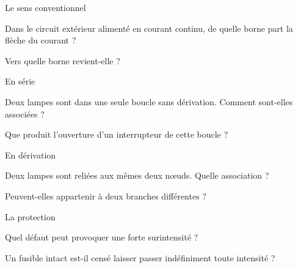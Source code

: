 \par\noindent\begin{minipage}{\linewidth}
\begin{exercice}[1]{Le sens conventionnel}
\begin{questions}
\item Dans le circuit extérieur alimenté en courant continu, de quelle borne part la flèche du courant ?
\item Vers quelle borne revient-elle ?
\end{questions}
\end{exercice}
\end{minipage}
\par\noindent\begin{minipage}{\linewidth}
\begin{exercice}[1]{En série}
\begin{questions}
\item Deux lampes sont dans une seule boucle sans dérivation. Comment sont-elles associées ?
\item Que produit l’ouverture d’un interrupteur de cette boucle ?
\end{questions}
\end{exercice}
\end{minipage}
\par\noindent\begin{minipage}{\linewidth}
\begin{exercice}[1]{En dérivation}
\begin{questions}
\item Deux lampes sont reliées aux mêmes deux nœuds. Quelle association ?
\item Peuvent-elles appartenir à deux branches différentes ?
\end{questions}
\end{exercice}
\end{minipage}
\par\noindent\begin{minipage}{\linewidth}
\begin{exercice}[1]{La protection}
\begin{questions}
\item Quel défaut peut provoquer une forte surintensité ?
\item Un fusible intact est-il censé laisser passer indéfiniment toute intensité ?
\end{questions}
\end{exercice}
\end{minipage}
